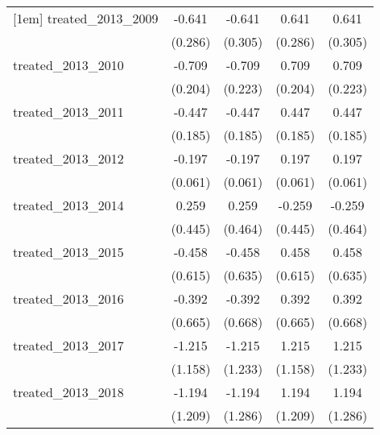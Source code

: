 {\begin{tabular}{l*{4}{c}}
[1em]
treated\_2013\_2009&      -0.641\sym{*}  &      -0.641\sym{*}  &       0.641\sym{*}  &       0.641\sym{*}  \\
            &     (0.286)         &     (0.305)         &     (0.286)         &     (0.305)         \\
[1em]
treated\_2013\_2010&      -0.709\sym{***}&      -0.709\sym{**} &       0.709\sym{***}&       0.709\sym{**} \\
            &     (0.204)         &     (0.223)         &     (0.204)         &     (0.223)         \\
[1em]
treated\_2013\_2011&      -0.447\sym{*}  &      -0.447\sym{*}  &       0.447\sym{*}  &       0.447\sym{*}  \\
            &     (0.185)         &     (0.185)         &     (0.185)         &     (0.185)         \\
[1em]
treated\_2013\_2012&      -0.197\sym{**} &      -0.197\sym{**} &       0.197\sym{**} &       0.197\sym{**} \\
            &     (0.061)         &     (0.061)         &     (0.061)         &     (0.061)         \\
[1em]
treated\_2013\_2014&       0.259         &       0.259         &      -0.259         &      -0.259         \\
            &     (0.445)         &     (0.464)         &     (0.445)         &     (0.464)         \\
[1em]
treated\_2013\_2015&      -0.458         &      -0.458         &       0.458         &       0.458         \\
            &     (0.615)         &     (0.635)         &     (0.615)         &     (0.635)         \\
[1em]
treated\_2013\_2016&      -0.392         &      -0.392         &       0.392         &       0.392         \\
            &     (0.665)         &     (0.668)         &     (0.665)         &     (0.668)         \\
[1em]
treated\_2013\_2017&      -1.215         &      -1.215         &       1.215         &       1.215         \\
            &     (1.158)         &     (1.233)         &     (1.158)         &     (1.233)         \\
[1em]
treated\_2013\_2018&      -1.194         &      -1.194         &       1.194         &       1.194         \\
            &     (1.209)         &     (1.286)         &     (1.209)         &     (1.286)         \\

\end{tabular}}
